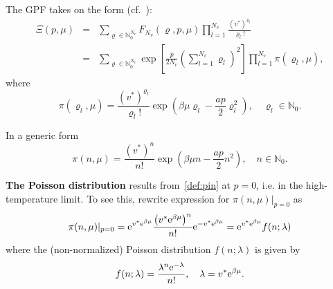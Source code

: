 \documentclass[12pt]{article}
\numberwithin{equation}{section}
\begin{document}
	The GPF takes on the form (cf.~\cite[2.11]{KKD20}):
	\begin{eqnarray}
		\label{eq:XiPi}
		\Xi(p,\mu) & = & \sum_{\varrho \in \mathbb{N}_0^{N_v}} F_{N_v}(\varrho, p, \mu) \prod\limits_{l=1}^{N_v} \frac{(v^*)^{\varrho_l}}{\varrho_l !}
		\nonumber\\
		& = & \sum_{\varrho \in \mathbb{N}_0^{N_v}} \exp[\frac{p}{2 N_v} \left(\sum_{l=1}^{N_v} \varrho_l\right)^2] \prod\limits_{l=1}^{N_v} \pi(\varrho_l, \mu),
	\end{eqnarray}
	where
	\begin{equation}
		\label{def:pirho}
		\pi(\varrho_l, \mu) = \frac{(v^*)^{\varrho_l}}{\varrho_l !} \exp(\beta\mu\varrho_l - \frac{ap}{2}\varrho_l^2), \quad \varrho_l \in \mathbb{N}_0.
	\end{equation}
	\begin{mdframed}[linecolor=black,linewidth=1pt,leftline=true]
		In a generic form
		\begin{equation}
			\label{def:pin}
			\pi(n, \mu) = \frac{(v^*)^n}{n!} \exp(\beta\mu n - \frac{ap}{2}n^2), \quad n \in \mathbb{N}_0.
		\end{equation}
	\end{mdframed}
	
	\textbf{The Poisson distribution} results from~\eqref{def:pin} at $p=0$, i.e. in the high-temperature limit. To see this, rewrite expression for $\pi(n,\mu)|_{p=0}$ as
	\begin{equation}
		\pi(n,\mu)|_{p=0} = {\rm e}^{v^* {\rm e}^{\beta\mu}} 
		\frac{\left(v^* {\rm e}^{\beta\mu}\right)^n}{n!} {\rm e}^{-v^* {\rm e}^{\beta\mu}} 
		= {\rm e}^{v^* {\rm e}^{\beta\mu}} f(n; \lambda)
	\end{equation}
	where the (non-normalized) Poisson distribution $f(n; \lambda)$ is given by
	\begin{equation}
		f(n; \lambda) = \frac{\lambda^n {\rm e}^{-\lambda}}{n!}, \quad \lambda = v^* {\rm e}^{\beta\mu}.
	\end{equation}
	
\end{document}
